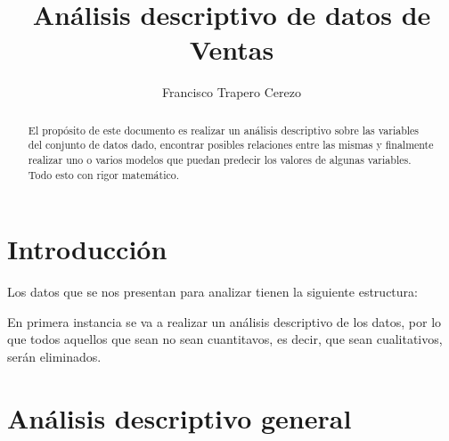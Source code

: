\documentclass{article}
\begin{document}
\title{Análisis descriptivo de datos de Ventas}
\author{Francisco Trapero Cerezo}

\maketitle

\begin{abstract}
El propósito de este documento es realizar un análisis descriptivo sobre las variables del conjunto de datos dado, encontrar posibles relaciones entre las mismas y finalmente realizar uno o varios modelos que puedan predecir los valores de algunas variables. Todo esto con rigor matemático.
\end{abstract}
\newpage

\tableofcontents
\newpage

\section{Introducción}
Los datos que se nos presentan para analizar tienen la siguiente estructura:




En primera instancia se va a realizar un análisis descriptivo de los datos, por lo que todos aquellos que sean no sean cuantitavos, es decir, que sean cualitativos, serán eliminados.

\section{Análisis descriptivo general}
\end{document}
